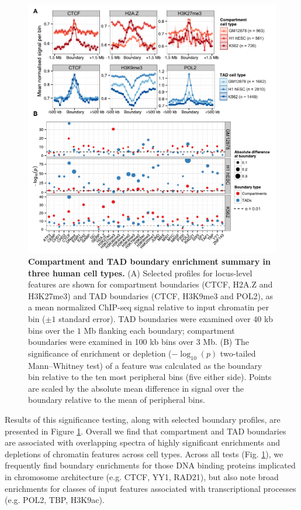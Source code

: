 \documentclass[a4paper,11pt,oneside]{book}
\begin{document}
\begin{figure}
\begin{center} 
\includegraphics[width=5.5in]{figs/boundarysummary.pdf}
\captionsetup{width=\textwidth}
\caption[Compartment and TAD boundary enrichment summary in three human cell types.]{ {\bf Compartment and TAD boundary enrichment summary in three human cell types.}
(A) Selected profiles for locus-level features are shown for compartment boundaries (CTCF, H2A.Z and H3K27me3) and TAD boundaries (CTCF, H3K9me3 and POL2), as a mean normalized ChIP-seq signal relative to input chromatin per bin ($\pm1$ standard error). TAD boundaries were examined over $40$ kb bins over the $1$ Mb flanking each boundary; compartment boundaries were examined in 100 kb bins over $3$ Mb. (B) The significance of enrichment or depletion ($-\log_{10}(p)$ two-tailed Mann--Whitney test) of a feature was calculated as the boundary bin relative to the ten most peripheral bins (five either side). Points are scaled by the absolute mean difference in signal over the boundary relative to the mean of peripheral bins.
}\label{fig:boundarysummary}
\end{center}
\end{figure} 

Results of this significance testing, along with selected boundary profiles, are presented in Figure \ref{fig:boundarysummary}. Overall we find that compartment and TAD boundaries are associated with overlapping spectra of highly significant enrichments and depletions of chromatin features across cell types. Across all tests (Fig. \ref{fig:boundarysummary}), we frequently find boundary enrichments for those DNA binding proteins
implicated in chromosome architecture (e.g. CTCF, YY1, RAD21), but also note broad enrichments for classes of input features associated with transcriptional processes (e.g. POL2, TBP, H3K9ac). 
\end{document}
